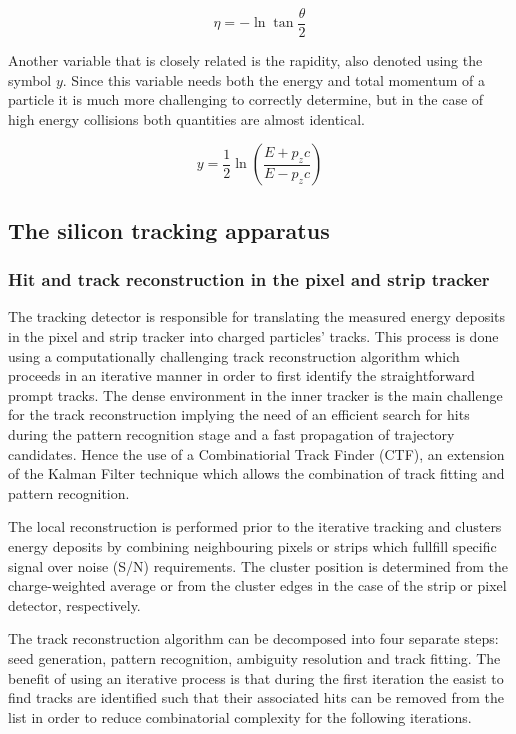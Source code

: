 \begin{equation} \label{eq::PseudoRapidity}
 \eta = - \ln \tan \frac{\theta}{2}
\end{equation}

Another variable that is closely related is the rapidity, also denoted using the symbol $y$. Since this variable needs both the energy and total momentum of a particle it is much more challenging to correctly determine, but in the case of high energy collisions both quantities are almost identical.

\begin{equation}
 y = \frac{1}{2} \ln \left( \frac{E+p_{z}c}{E - p_{z}c} \right)
\end{equation}

\subsection{The silicon tracking apparatus}

\subsubsection*{Hit and track reconstruction in the pixel and strip tracker}

The tracking detector is responsible for translating the measured energy deposits in the pixel and strip tracker into charged particles' tracks. This process is done using a computationally challenging track reconstruction algorithm which proceeds in an iterative manner in order to first identify the straightforward prompt tracks.
The dense environment in the inner tracker is the main challenge for the track reconstruction implying the need of an efficient search for hits during the pattern recognition stage and a fast propagation of trajectory candidates. Hence the use of a Combinatiorial Track Finder (CTF), an extension of the Kalman Filter technique which allows the combination of track fitting and pattern recognition.

The local reconstruction is performed prior to the iterative tracking and clusters energy deposits by combining neighbouring pixels or strips which fullfill specific signal over noise (S/N) requirements. The cluster position is determined from the charge-weighted average or from the cluster edges in the case of the strip or pixel detector, respectively.

The track reconstruction algorithm can be decomposed into four separate steps: seed generation, pattern recognition, ambiguity resolution and track fitting.
The benefit of using an iterative process is that during the first iteration the easist to find tracks are identified such that their associated hits can be removed from the list in order to reduce combinatorial complexity for the following iterations.

